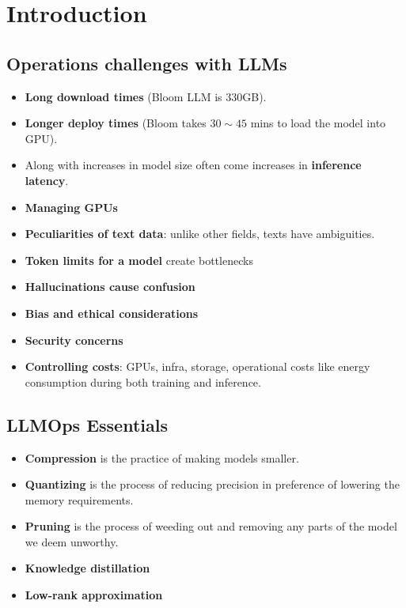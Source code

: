 \chapter{Introduction}

\section{Operations challenges with LLMs}
\begin{itemize}
	\item \textbf{Long download times} (\eg Bloom LLM is 330GB).
	\item \textbf{Longer deploy times} (\eg Bloom takes $30\sim 45$ mins to load the model into GPU).
	\item Along with increases in model size often come increases in \textbf{inference latency}. 
	\item \textbf{Managing GPUs}
	\item \textbf{Peculiarities of text data}: unlike other fields, texts have ambiguities. 
	\item \textbf{Token limits for a model} create bottlenecks
	\item \textbf{Hallucinations cause confusion} 
	\item \textbf{Bias and ethical considerations}
	\item \textbf{Security concerns}
	\item \textbf{Controlling costs}: \eg GPUs, infra, storage, operational costs like energy consumption during both training and inference. 
\end{itemize}

\section{LLMOps Essentials}

\begin{itemize}
	\item \textbf{Compression} is the practice of making models smaller. 
	\item \textbf{Quantizing} is the process of reducing precision in preference of lowering the memory requirements. 
	\item \textbf{Pruning} is the process of weeding out and removing any parts of the model we deem unworthy. 
	\item \textbf{Knowledge distillation}
	\item \textbf{Low-rank approximation}
\end{itemize}





